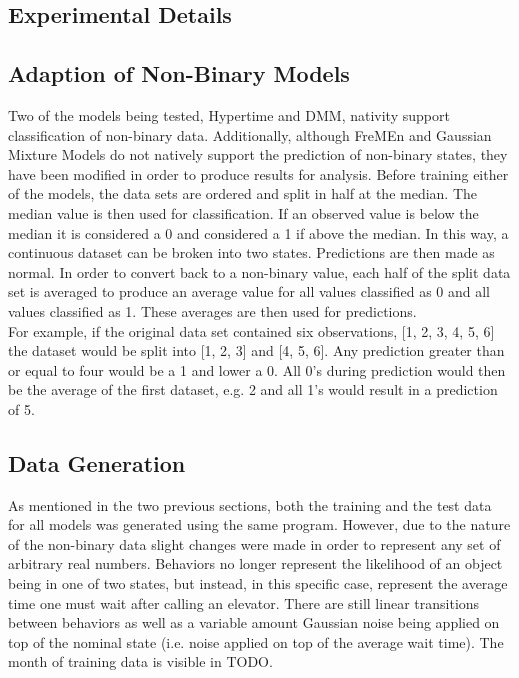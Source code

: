   \subsection{ Experimental Details }

  \subsection{ Adaption of Non-Binary Models }

  Two of the models being tested, Hypertime and DMM, nativity support
  classification of non-binary data. Additionally, although FreMEn and Gaussian Mixture Models
  do not natively support the prediction of non-binary states, they have been
  modified in order to produce results for analysis. Before training either of
  the models, the data sets are ordered and split in half at the median. The
  median value is then used for classification. If an observed value is below
  the median it is considered a 0 and considered a 1 if above the median. In this way, a continuous
  dataset can be broken into two states. Predictions are then made as normal.
  In order to convert back to a non-binary value, each half of the split data
  set is averaged to produce an average value for all values classified as 0 and
  all values classified as 1. These averages are then used for predictions. \\

  For example, if the original data set contained six observations,
  [1, 2, 3, 4, 5, 6] the dataset would be split into [1, 2, 3] and [4, 5, 6].
  Any prediction greater than or equal to four would be a 1 and lower a 0. All 0's during
  prediction would then be the average of the first dataset, e.g. 2 and all
  1's would result in a prediction of 5.

  \subsection{ Data Generation }

  As mentioned in the two previous sections, both the training and the test
  data for all models was generated using the same program. However,
  due to the nature of the non-binary data slight changes were made in order
  to represent any set of arbitrary real numbers. Behaviors no longer represent
  the likelihood of an object being in one of two states, but instead, in this
  specific case, represent the average time one must wait after calling an
  elevator. There are still linear transitions between behaviors as well as
  a variable amount Gaussian noise being applied on top of the nominal state
  (i.e. noise applied on top of the average wait time). The month of training
  data is visible in TODO. \\


